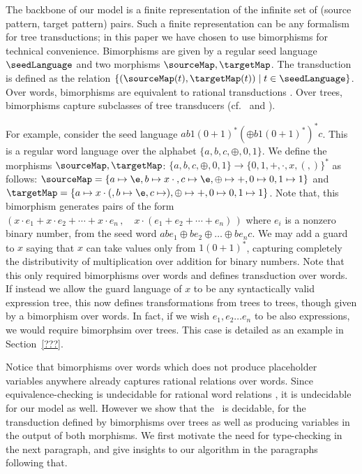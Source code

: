 The backbone of our model is a finite representation of the infinite set of (source pattern, target pattern) pairs. Such a finite representation can be any formalism for tree transductions; in this paper we have chosen to use bimorphisms for technical convenience. Bimorphisms are given by a regular seed language $\seedLanguage$ and two morphisms $\sourceMap, \targetMap$. The transduction is defined as the relation $\{(\sourceMap(t), \targetMap(t)) \mid t \in \seedLanguage\}$. Over words, bimorphisms are equivalent to rational transductions \cite{Nivat68}. Over trees, bimorphisms capture subclasses of tree transducers (cf.~\cite[Section 6.5]{tata} and \cite{Engelfriet75}).

For example, consider the seed language   $a b 1(0+1)^\ast (\oplus b 1(0+1)^\ast)^\ast c$. This is a regular word language over the alphabet $\{a, b, c, \oplus, 0, 1\}$. We define the morphisms $\sourceMap, \targetMap$: $\{a, b, c, \oplus, 0, 1\} \to \{0,1, +, \cdot, x, (, ) \}^\ast$  as follows: $\sourceMap= \{a \mapsto \e, b \mapsto x \cdot {}, c \mapsto \e, \oplus \mapsto +, 0 \mapsto 0, 1 \mapsto 1\}$ and $\targetMap= \{a \mapsto x \cdot (, b \mapsto \e, c \mapsto ), \oplus \mapsto +, 0 \mapsto 0, 1 \mapsto 1\}$. Note that, this bimorphism generates pairs of the form $(x \cdot e_1 + x\cdot e_2 + \cdots + x\cdot e_n\,, \quad x\cdot (e_1 + e_2 + \cdots + e_n)\,)$ where $e_i$ is a nonzero binary number, from the seed word $a b e_1 \oplus b e_2 \oplus \dots \oplus b e_n c$. We may add a guard to $x$ saying that $x$ can take values only from $1(0+1)^\ast$, capturing completely the distributivity of multiplication over addition for binary numbers. Note that this only required bimorphisms over words and defines transduction over words. If instead we allow the guard language of $x$ to be any syntactically valid expression tree, this now defines transformations from trees to trees, though given by a bimorphism over words. In fact, if we wish $e_1, e_2 \dots e_n$ to be also expressions, we would require bimorphsim over trees. This case is detailed as an example in Section~\ref{???}.%

Notice that bimorphisms over words which does not produce placeholder variables anywhere already captures rational relations over words. Since equivalence-checking is undecidable for rational word relations \cite{FR1968, Griffiths1968}, it is undecidable for our model as well. However we show that the \tcp\ is decidable, for the transduction defined by bimorphisms over trees as well as producing variables in the output of both morphisms.  We first motivate the need for type-checking in the next paragraph, and give insights to our algorithm in the paragraphs following that.

